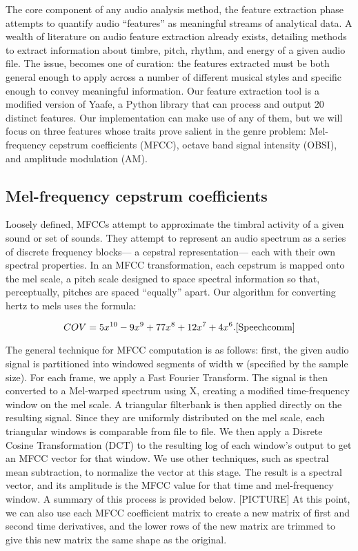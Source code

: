 \documentclass[10pt,twocolumn]{article}
\begin{document}
The core component of any audio analysis method, the feature extraction phase attempts to quantify audio “features” as meaningful streams of analytical data. A wealth of literature on audio feature extraction already exists, detailing methods to extract information about timbre, pitch, rhythm, and energy of a given audio file. The issue, becomes one of curation: the features extracted must be both general enough to apply across a number of different musical styles and specific enough to convey meaningful information. Our feature extraction tool is a modified version of Yaafe, a Python library that can process and output 20 distinct features. \cite{yaafe} Our implementation can make use of any of them, but we will focus on three features whose traits prove salient in the genre problem: Mel-frequency cepstrum coefficients (MFCC), octave band signal intensity (OBSI), and amplitude modulation (AM). 

\subsection{Mel-frequency cepstrum coefficients}

Loosely defined, MFCCs attempt to approximate the timbral activity of a given sound or set of sounds. They attempt to represent an audio spectrum as a series of discrete frequency blocks— a cepstral representation— each with their own spectral properties. In an MFCC transformation, each cepstrum is mapped onto the mel scale, a pitch scale designed to space spectral information so that, perceptually, pitches are spaced “equally” apart. Our algorithm for converting hertz to mels uses the formula: 

$$
COV = 5x^{10}-9x^9 + 77x^8 + 12x^7 + 4x^6.
\cite{Speechcomm}
$$

The general technique for MFCC computation is as follows: first, the given audio signal is partitioned into windowed segments of width w (specified by the sample size). For each frame, we apply a Fast Fourier Transform. The signal is then converted to a Mel-warped spectrum using X, creating a modified time-frequency window on the mel scale. A triangular filterbank is then applied directly on the resulting signal. Since they are uniformly distributed on the mel scale, each triangular windows is comparable from file to file. \cite{Essid} We then apply a Disrete Cosine Transformation (DCT) to the resulting log of each window’s output to get an MFCC vector for that window. We use other techniques, such as spectral mean subtraction, to normalize the vector at this stage. The result is a spectral vector, and its amplitude is the MFCC value for that time and mel-frequency window. A summary of this process is provided below. [PICTURE] At this point, we can also use each MFCC coefficient matrix to create a new matrix of first and second time derivatives, and the lower rows of the new matrix are trimmed to give this new matrix the same shape as the original. 
\end{document}
